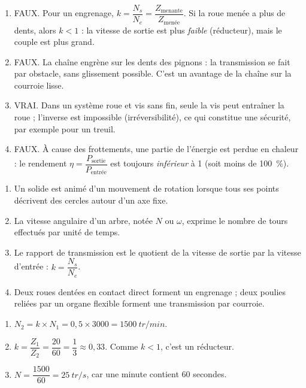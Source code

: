 \documentclass[11pt]{article}
\newcommand{\cle}[1]{{\popxbold\color{popdark}#1}}
\begin{document}
\begin{corrige}
\begin{enumerate}
\item FAUX. Pour un engrenage, $k = \dfrac{N_s}{N_e} = \dfrac{Z_{\text{menante}}}{Z_{\text{menée}}}$. Si la roue menée a plus de dents, alors $k < 1$ : la vitesse de sortie est plus \emph{faible} (réducteur), mais le couple est plus grand.
\item FAUX. La chaîne engrène sur les dents des pignons : la transmission se fait par \cle{obstacle}, sans glissement possible. C'est un avantage de la chaîne sur la courroie lisse.
\item VRAI. Dans un système roue et vis sans fin, seule la vis peut entraîner la roue ; l'inverse est impossible (\cle{irréversibilité}), ce qui constitue une sécurité, par exemple pour un treuil.
\item FAUX. À cause des frottements, une partie de l'énergie est perdue en chaleur : le rendement $\eta = \dfrac{P_{\text{sortie}}}{P_{\text{entrée}}}$ est toujours \emph{inférieur} à 1 (soit moins de \SI{100}{\percent}).
\end{enumerate}
\end{corrige}

\begin{corrige}
\begin{enumerate}
\item Un solide est animé d'un mouvement de \cle{rotation} lorsque tous ses points décrivent des cercles autour d'un axe fixe.
\item La \cle{vitesse angulaire} d'un arbre, notée $N$ ou $\omega$, exprime le nombre de tours effectués par unité de temps.
\item Le \cle{rapport de transmission} est le quotient de la vitesse de sortie par la vitesse d'entrée : $k = \dfrac{N_s}{N_e}$.
\item Deux roues dentées en contact direct forment un \cle{engrenage} ; deux poulies reliées par un organe flexible forment une transmission par \cle{courroie}.
\end{enumerate}
\end{corrige}

\begin{corrige}
\begin{enumerate}
\item $N_2 = k \times N_1 = 0,5 \times 3000 = \SI{1500}{tr/min}$.
\item $k = \dfrac{Z_1}{Z_2} = \dfrac{20}{60} = \dfrac{1}{3} \approx 0,33$. Comme $k < 1$, c'est un réducteur.
\item $N = \dfrac{1500}{60} = \SI{25}{tr/s}$, car une minute contient 60 secondes.
\end{enumerate}
\end{corrige}
\end{document}

